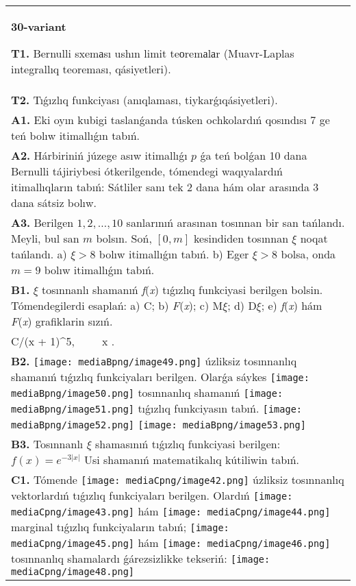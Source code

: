 \documentclass{article}
\begin{document}
\begin{tabular}{m{17cm}}
\textbf{30-variant}
\newline

\textbf{T1.} Bernulli sxemаsı ushın limit teоremаlаr (Muavr-Laplas integrallıq teoreması, qásiyetleri).
 \\
\textbf{T2.} Tıǵızlıq funkciyası (anıqlaması, tiykarǵıqásiyetleri).
 \\
\textbf{A1.} Eki oyın kubigi taslanǵanda túsken ochkolardıń qosındısı 7 ge teń bolıw itimallıǵın tabıń.
 \\
\textbf{A2.} Hárbiriniń júzege asıw itimallıǵı $p$ ǵa teń bolǵan 10 dana Bernulli tájiriybesi ótkerilgende, tómendegi waqıyalardıń itimallıqların tabıń: Sátliler sanı tek 2 dana hám olar arasında 3 dana sátsiz bolıw.
 \\
\textbf{A3.} Berilgen $1,2,\ldots ,10$ sanlarınıń arasınan tosınnan bir san tańlandı. Meyli, bul san $m$ bolsın. Soń, $\left[ 0,m \right]$ kesindiden tosınnan $\xi $ noqat tańlandı. a) $\xi >8$ bolıw itimallıǵın tabıń. b) Eger $\xi >8$ bolsa, onda $m=9$ bolıw itimallıǵın tabıń.
 \\
\textbf{B1.} $\xi$ tosınnanlı shamanıń \emph{f}(\emph{x}) tıǵızlıq funkciyasi berilgen bolsin. Tómendegilerdi esaplań: a) C; b) \emph{F}(\emph{x}); c) M$\xi$; d) D$\xi$; e) \emph{f}(\emph{x}) hám \emph{F}(\emph{x}) grafiklarin sızıń.\(f(x) = \left\{ \begin{matrix}
\ \ \ \ \ \ \ \ 0,\ \ \ \ \ \ x < 0, \\
C/(x + 1)^{5},\ \ \ \ \ x \geq 0.\ \ 
\end{matrix} \right.\ \)
 \\
\textbf{B2.} 
\texttt{[image: mediaBpng/image49.png]} úzliksiz tosınnanlıq shamanıń tıǵızlıq funkciyaları berilgen. Olarǵa sáykes \texttt{[image: mediaBpng/image50.png]} tosınnanlıq shamanıń \texttt{[image: mediaBpng/image51.png]} tıǵızlıq funkciyasın tabıń. \texttt{[image: mediaBpng/image52.png]} \texttt{[image: mediaBpng/image53.png]}
 \\
\textbf{B3.} Tosınnanlı $\xi$ shamasınıń tıǵızlıq funkciyasi berilgen: \(f(x) = e^{- 3|x|}\) Usi shamanıń matematikalıq kútiliwin tabıń.
 \\
\textbf{C1.} Tómende \texttt{[image: mediaCpng/image42.png]} úzliksiz tosınnanlıq vektorlardıń tıǵızlıq funkciyaları berilgen. Olardıń \texttt{[image: mediaCpng/image43.png]} hám \texttt{[image: mediaCpng/image44.png]} marginal tıǵızlıq funkciyaların tabıń; \texttt{[image: mediaCpng/image45.png]} hám \texttt{[image: mediaCpng/image46.png]} tosınnanlıq shamalardı ǵárezsizlikke tekseriń: \texttt{[image: mediaCpng/image48.png]}

\end{tabular}
\end{document}

